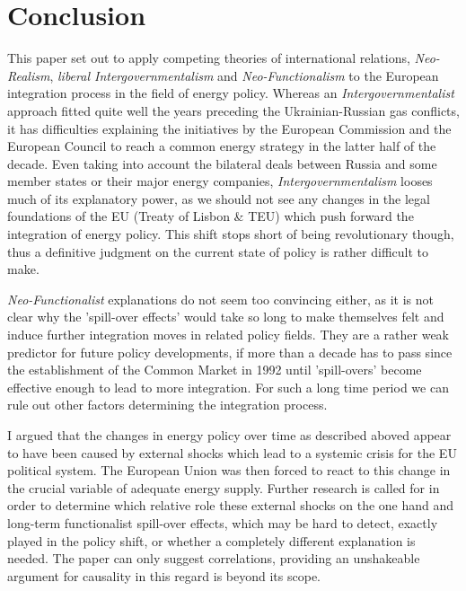 \documentclass[11pt,a4paper,english]{scrreprt}
\begin{document}
  
 
\chapter{Conclusion}
  
This paper set out to apply competing theories of international relations,
\emph{Neo-Realism}, \emph{liberal Intergovernmentalism} and
\emph{Neo-Functionalism} to the European integration process in the field of
energy policy. Whereas an \emph{Intergovernmentalist} approach fitted quite
well the years preceding the Ukrainian-Russian gas conflicts, it has
difficulties explaining the initiatives by the European Commission and
the European Council to reach a common energy strategy in the latter half of the
decade. Even taking into account the bilateral deals between Russia and some
member states or their major energy companies, \emph{Intergovernmentalism}
looses much of its explanatory power, as we should not see any changes in the
legal foundations of the EU (Treaty of Lisbon \& TEU) which push forward the
integration of energy policy. This shift stops short of being revolutionary
though, thus a definitive judgment on the current state of policy is rather
difficult to make.\par

\emph{Neo-Functionalist} explanations do not seem too convincing either, as it
is not clear why the 'spill-over effects' would take so long to make themselves
felt and induce further integration moves in related policy fields. They are a
rather weak predictor for future policy developments, if more than a decade has
to pass since the establishment of the Common Market in 1992 until 'spill-overs'
become effective enough to lead to more integration. For such a long time
period we can rule out other factors determining the integration process.\par
 
I argued that the changes in energy policy over time as described aboved
appear to have been caused by external shocks which lead to a systemic crisis
for the EU political system. The European Union was then forced to react to this
change in the crucial variable of adequate energy supply. Further research is
called for in order to determine which relative role these external shocks on
the one hand and long-term functionalist spill-over effects, which may be hard
to detect, exactly played in the policy shift, or whether a completely different
explanation is needed. The paper can only suggest correlations, providing an
unshakeable argument for causality in this regard is beyond its scope.\par
\end{document}
